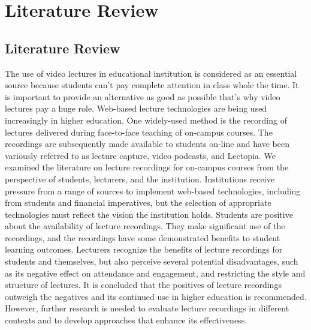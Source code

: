 
\chapter{Literature Review} %
\label{Chapter2}

\section{Literature Review}
The use of video lectures in educational institution is considered as an essential source because students can't pay complete attention in class whole the time. It is important to provide an alternative as good as possible that's why video lectures pay a huge role. Web-based lecture technologies are being used increasingly in higher education. One widely-used method is the recording of lectures delivered during face-to-face teaching of on-campus courses. The recordings are subsequently made available to students on-line and have been variously referred to as lecture capture, video podcasts, and Lectopia. We examined the literature on lecture recordings for on-campus courses from the perspective of students, lecturers, and the institution. Institutions receive pressure from a range of sources to implement web-based technologies, including from students and financial imperatives, but the selection of appropriate technologies must reflect the vision the institution holds. Students are positive about the availability of lecture recordings. They make significant use of the recordings, and the recordings have some demonstrated benefits to student learning outcomes. Lecturers recognize the benefits of lecture recordings for students and themselves, but also perceive several potential disadvantages, such as its negative effect on attendance and engagement, and restricting the style and structure of lectures. It is concluded that the positives of lecture recordings outweigh the negatives and its continued use in higher education is recommended. However, further research is needed to evaluate lecture recordings in different contexts and to develop approaches that enhance its effectiveness.\cite{OCallaghan2017}

